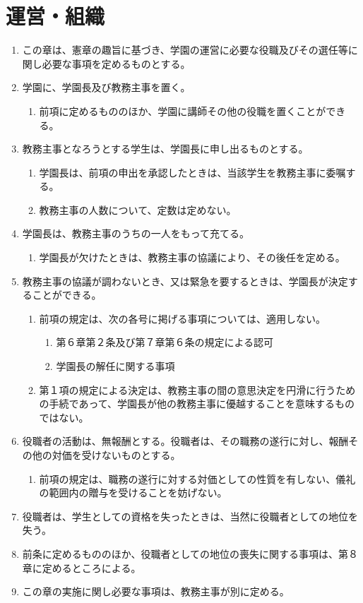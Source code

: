\newpage
\chapter{運営・組織}
\begin{enumerate}[label=第\arabic*条　]
  \item この章は、憲章の趣旨に基づき、学園の運営に必要な役職及びその選任等に関し必要な事項を定めるものとする。
  \item 学園に、学園長及び教務主事を置く。
    \begin{enumerate}[label=\arabic*　,start=2,leftmargin=*]
      \item 前項に定めるもののほか、学園に講師その他の役職を置くことができる。
    \end{enumerate}
  \item 教務主事となろうとする学生は、学園長に申し出るものとする。
    \begin{enumerate}[label=\arabic*　,start=2,leftmargin=*]
      \item 学園長は、前項の申出を承認したときは、当該学生を教務主事に委嘱する。
      \item 教務主事の人数について、定数は定めない。
    \end{enumerate}
  \item 学園長は、教務主事のうちの一人をもって充てる。
    \begin{enumerate}[label=\arabic*　,start=2,leftmargin=*]
      \item 学園長が欠けたときは、教務主事の協議により、その後任を定める。
    \end{enumerate}
  \item 教務主事の協議が調わないとき、又は緊急を要するときは、学園長が決定することができる。
    \begin{enumerate}[label=\arabic*　,start=2,leftmargin=*]
      \item 前項の規定は、次の各号に掲げる事項については、適用しない。
        \begin{enumerate}[label=(\arabic*)　]
          \item 第６章第２条及び第７章第６条の規定による認可
          \item 学園長の解任に関する事項
        \end{enumerate}
      \item 第１項の規定による決定は、教務主事の間の意思決定を円滑に行うための手続であって、学園長が他の教務主事に優越することを意味するものではない。
    \end{enumerate}
  \item 役職者の活動は、無報酬とする。役職者は、その職務の遂行に対し、報酬その他の対価を受けないものとする。
    \begin{enumerate}[label=\arabic*　,start=2,leftmargin=*]
      \item 前項の規定は、職務の遂行に対する対価としての性質を有しない、儀礼の範囲内の贈与を受けることを妨げない。
    \end{enumerate}
  \item 役職者は、学生としての資格を失ったときは、当然に役職者としての地位を失う。
  \item 前条に定めるもののほか、役職者としての地位の喪失に関する事項は、第８章に定めるところによる。
  \item この章の実施に関し必要な事項は、教務主事が別に定める。
\end{enumerate}
